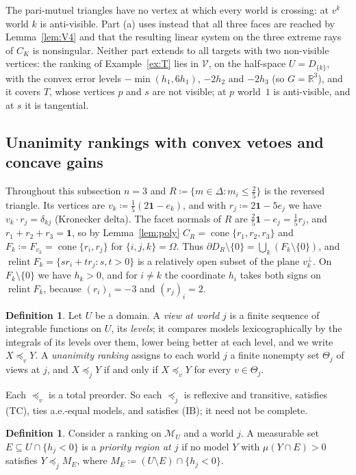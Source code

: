\documentclass[11pt]{article}
\newcommand{\R}{\mathbb{R}}
\newcommand{\one}{\mathbf{1}}
\newcommand{\M}{\mathcal{M}}
\newcommand{\VV}{\mathcal{V}}
\DeclareMathOperator{\cone}{cone}
\DeclareMathOperator{\relint}{relint}
\theoremstyle{plain}
\theoremstyle{definition}
\newtheorem{definition}[theorem]{Definition}
\theoremstyle{remark}
\begin{document}
The pari-mutuel triangles have no vertex at which every world is crossing: at $v^k$ world
$k$ is anti-visible. Part (a) uses instead that all three faces are reached by
Lemma~\ref{lem:V4} and that the resulting linear system on the three extreme rays of $C_K$
is nonsingular. Neither part extends to all targets with two non-visible vertices: the
ranking of Example~\ref{ex:T} lies in $\VV$, on the half-space $U=D_{\{k\}}$, with the
convex error levels $-\min(h_1,6h_1)$, $-2h_2$ and $-2h_3$ (so $G=\R^3$), and it covers $T$,
whose vertices $p$ and $s$ are not visible; at $p$ world~$1$ is anti-visible, and at $s$ it
is tangential.

\subsection{Unanimity rankings with convex vetoes and concave gains}\label{sec:excl-unan}

Throughout this subsection $n=3$ and $R\coloneqq\{m\in\Delta:m_i\le\frac25\}$ is the
reversed triangle. Its vertices are $v_k\coloneqq\frac15(2\one-e_k)$, and with
$r_j\coloneqq2\one-5e_j$ we have $v_k\cdot r_j=\delta_{kj}$ (Kronecker delta). The facet
normals of $R$ are $\frac25\one-e_j=\frac15r_j$, and $r_1+r_2+r_3=\one$, so by
Lemma~\ref{lem:poly} $C_R=\cone\{r_1,r_2,r_3\}$ and $F_k\coloneqq F_{v_k}=\cone\{r_i,r_j\}$
for $\{i,j,k\}=\Omega$. Thus $\partial D_R\setminus\{0\}=\bigcup_k(F_k\setminus\{0\})$, and
$\relint F_k=\{sr_i+tr_j:s,t>0\}$ is a relatively open subset of the plane $v_k^\perp$. On
$F_k\setminus\{0\}$ we have $h_k>0$, and for $i\ne k$ the coordinate $h_i$ takes both
signs on $\relint F_k$, because $(r_i)_i=-3$ and $(r_j)_i=2$.

\begin{definition}\label{def:unan}
Let $U$ be a domain. A \emph{view at world $j$} is a finite sequence of integrable
functions on $U$, its \emph{levels}; it compares models lexicographically by the
integrals of its levels over them, lower being better at each level, and we write
$X\preceq_vY$. A \emph{unanimity ranking} assigns to each world $j$ a finite nonempty set
$\Theta_j$ of views at $j$, and $X\preceq_jY$ if and only if $X\preceq_vY$ for every
$v\in\Theta_j$.
\end{definition}

Each $\preceq_v$ is a total preorder. So each $\preceq_j$ is reflexive and transitive,
satisfies (TC), ties a.e.-equal models, and satisfies (IB); it need not be complete.

\begin{definition}\label{def:priority}
Consider a ranking on $\M_U$ and a world $j$. A measurable set $E\subseteq U\cap\{h_j<0\}$
is a \emph{priority region at $j$} if no model $Y$ with $\mu(Y\cap E)>0$ satisfies
$Y\preceq_jM_E$, where $M_E\coloneqq(U\setminus E)\cap\{h_j<0\}$.
\end{definition}
\end{document}
